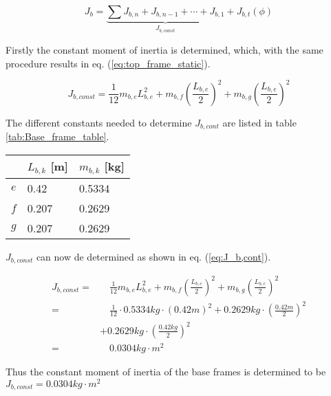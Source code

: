 \documentclass[../../main]{subfiles}
\begin{document}
\begin{equation}
  \label{eq:Base_frame_equ}
  J_b =
  \underbrace{
  \sum J_{b,n} + J_{b,n-1} + \dotsb + J_{b,1}}_\text{$J_{b,const}$} + J_{b,t}(\phi)
\end{equation}

Firstly the constant moment of inertia is determined, which, with the same procedure results in eq. (\ref{eq:top_frame_static}).

\begin{equation}
  J_{b,const} = \frac{1}{12}m_{b,e}L_{b,e}^2 + m_{b,f} \left( \frac{L_{b,e}}{2} \right)^2 + m_{b,g}\left(\frac{L_{b,e}}{2}\right)^2
\end{equation}

The different constants needed to determine $J_{b,cont}$ are listed in table \ref{tab:Base_frame_table}.

\begin{table}[H]
\centering
\begin{tabular}{|l|l|l|}
\hline
  & $L_{b,k}$ [m]  & $m_{b,k}$ [kg]  \\
\hline
$e$ & 0.42  & 0.5334  \\
\hline
$f$ & 0.207  & 0.2629  \\
\hline
$g$ & 0.207 & 0.2629  \\
\hline
\end{tabular}
    \label{tab:mass_table}
\end{table}

$J_{b,const}$ can now de determined as shown in eq. (\ref{eq:J_b,cont}).

\begin{equation}
  \label{eq:J_b,const}
  \begin{split}
      J_{b,const} =& \quad \frac{1}{12}m_{b,e}L_{b,e}^2 + m_{b,f} \left( \frac{L_{b,e}}{2} \right)^2 + m_{b,g}\left(\frac{L_{b,e}}{2}\right)^2\\
      =& \quad \frac{1}{12} \cdot 0.5334\si{kg} \cdot (0.42 \si{m})^2 + 0.2629\si{kg} \cdot \left( \frac{0.42 \si{m}}{2} \right)^2 \\
      &+ 0.2629 \si{kg}\cdot \left(\frac{0.42 \si{kg}}{2}\right)^2\\
      =& \quad 0.0304 \si{kg\cdot m^2}
  \end{split}
\end{equation}

Thus the constant moment of inertia of the base frames is determined to be $J_{b,const} = 0.0304 \si{kg\cdot m^2}$
\\
\end{document}
